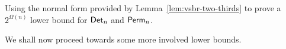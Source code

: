 \begin{exercise}
Using the normal form provided by Lemma~\ref{lem:vsbr-two-thirds} to prove a $2^{\Omega(n)}$ lower bound for $\mathsf{Det}_n$ and $\mathsf{Perm}_n$. 
\end{exercise}




We shall now proceed towards some more involved lower bounds. 




